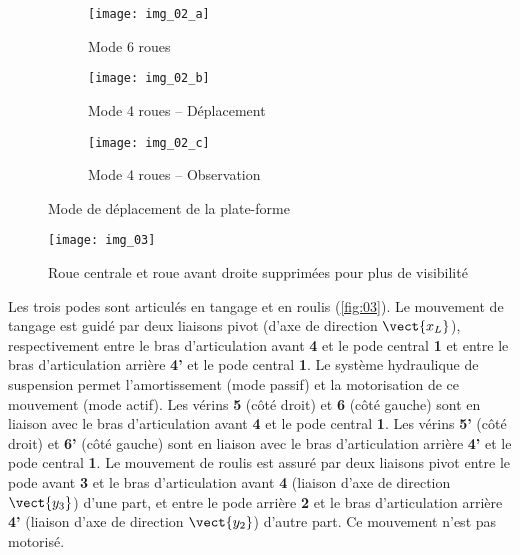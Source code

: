 \begin{figure}[H]
\centering
\begin{subfigure}{0.25\textwidth}
    \texttt{[image: img\_02\_a]}
    \caption{Mode 6 roues}
    \label{fig:02a}
\end{subfigure} \hfill
\begin{subfigure}{0.25\textwidth}
    \texttt{[image: img\_02\_b]}
    \caption{Mode 4 roues -- Déplacement}
    \label{fig:02a}
\end{subfigure} \hfill
\begin{subfigure}{0.25\textwidth}
    \texttt{[image: img\_02\_c]}
    \caption{Mode 4 roues -- Observation}
    \label{fig:02a}
\end{subfigure}\caption{Mode de déplacement de la plate-forme \label{fig:02}}
\end{figure}


\begin{figure}[H]
\centering
\texttt{[image: img\_03]}
\caption{Roue centrale et roue avant droite supprimées pour plus de visibilité \label{img:03}}
\end{figure}

Les trois podes sont articulés en tangage et en roulis (\autoref{fig:03}). Le mouvement de tangage est guidé par deux liaisons pivot (d’axe de direction  $\vect{x_L}$), respectivement entre le bras d’articulation avant \textbf{4} et le pode central \textbf{1} et entre le bras d’articulation arrière \textbf{4’} et le pode central \textbf{1}. Le système hydraulique de suspension permet l’amortissement (mode passif) et la motorisation de ce mouvement (mode actif). Les vérins \textbf{5} (côté droit) et \textbf{6} (côté gauche) sont en liaison avec le bras d’articulation avant \textbf{4} et le pode central \textbf{1}. Les vérins \textbf{5’} (côté droit) et \textbf{6’} (côté gauche) sont en liaison avec le bras d’articulation arrière \textbf{4’} et le pode central \textbf{1}. Le mouvement de roulis est assuré par deux liaisons pivot entre le pode avant \textbf{3} et le bras d’articulation avant \textbf{4} (liaison d’axe de direction $\vect{y_3}$) d’une part, et entre le pode arrière \textbf{2} et le bras d’articulation arrière \textbf{4’}  (liaison d’axe de direction $\vect{y_2}$) d’autre part. Ce mouvement n’est pas motorisé. 

